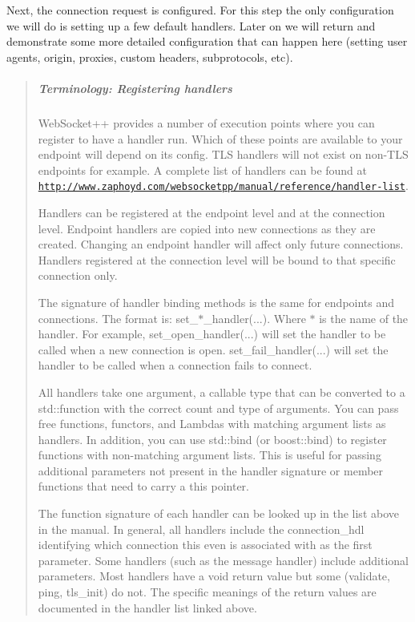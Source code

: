 Next, the connection request is configured. For this step the only configuration we will do is setting up a few default handlers. Later on we will return and demonstrate some more detailed configuration that can happen here (setting user agents, origin, proxies, custom headers, subprotocols, etc).

\begin{quote}
\subparagraph*{Terminology\+: Registering handlers}

Web\+Socket++ provides a number of execution points where you can register to have a handler run. Which of these points are available to your endpoint will depend on its config. T\+LS handlers will not exist on non-\/\+T\+LS endpoints for example. A complete list of handlers can be found at \href{http://www.zaphoyd.com/websocketpp/manual/reference/handler-list}{\tt http\+://www.\+zaphoyd.\+com/websocketpp/manual/reference/handler-\/list}.

Handlers can be registered at the endpoint level and at the connection level. Endpoint handlers are copied into new connections as they are created. Changing an endpoint handler will affect only future connections. Handlers registered at the connection level will be bound to that specific connection only.

The signature of handler binding methods is the same for endpoints and connections. The format is\+: {\ttfamily set\+\_\+$\ast$\+\_\+handler(...)}. Where $\ast$ is the name of the handler. For example, {\ttfamily set\+\_\+open\+\_\+handler(...)} will set the handler to be called when a new connection is open. {\ttfamily set\+\_\+fail\+\_\+handler(...)} will set the handler to be called when a connection fails to connect.

All handlers take one argument, a callable type that can be converted to a {\ttfamily std\+::function} with the correct count and type of arguments. You can pass free functions, functors, and Lambdas with matching argument lists as handlers. In addition, you can use {\ttfamily std\+::bind} (or {\ttfamily boost\+::bind}) to register functions with non-\/matching argument lists. This is useful for passing additional parameters not present in the handler signature or member functions that need to carry a \textquotesingle{}this\textquotesingle{} pointer.

The function signature of each handler can be looked up in the list above in the manual. In general, all handlers include the {\ttfamily connection\+\_\+hdl} identifying which connection this even is associated with as the first parameter. Some handlers (such as the message handler) include additional parameters. Most handlers have a void return value but some ({\ttfamily validate}, {\ttfamily ping}, {\ttfamily tls\+\_\+init}) do not. The specific meanings of the return values are documented in the handler list linked above. \end{quote}


